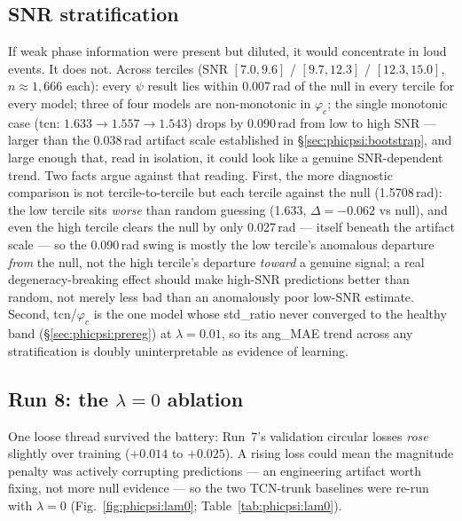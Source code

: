 \subsection{SNR stratification}
\label{sec:phicpsi:snr}

If weak phase information were present but diluted, it would concentrate in loud events.
It does not.
Across terciles (SNR $[7.0, 9.6]$ / $[9.7, 12.3]$ / $[12.3, 15.0]$, $n \approx 1{,}666$ each): every $\psi$ result lies within 0.007\,rad of the null in every tercile for every model; three of four models are non-monotonic in $\varphi_c$; the single monotonic case (tcn: $1.633 \to 1.557 \to 1.543$) drops by 0.090\,rad from low to high SNR --- larger than the 0.038\,rad artifact scale established in \S\ref{sec:phicpsi:bootstrap}, and large enough that, read in isolation, it could look like a genuine SNR-dependent trend.
Two facts argue against that reading.
First, the more diagnostic comparison is not tercile-to-tercile but each tercile against the null (1.5708\,rad): the low tercile sits \emph{worse} than random guessing (1.633, $\Delta = -0.062$ vs null), and even the high tercile clears the null by only 0.027\,rad --- itself beneath the artifact scale --- so the 0.090\,rad swing is mostly the low tercile's anomalous departure \emph{from} the null, not the high tercile's departure \emph{toward} a genuine signal; a real degeneracy-breaking effect should make high-SNR predictions better than random, not merely less bad than an anomalously poor low-SNR estimate.
Second, tcn/$\varphi_c$ is the one model whose std\_ratio never converged to the healthy band (\S\ref{sec:phicpsi:prereg}) at $\lambda = 0.01$, so its ang\_MAE trend across any stratification is doubly uninterpretable as evidence of learning.

\subsection{Run 8: the $\lambda = 0$ ablation}
\label{sec:phicpsi:ablation}

One loose thread survived the battery: Run~7's validation circular losses \emph{rose} slightly over training ($+0.014$ to $+0.025$).
A rising loss could mean the magnitude penalty was actively corrupting predictions --- an engineering artifact worth fixing, not more null evidence --- so the two TCN-trunk baselines were re-run with $\lambda = 0$ (Fig.~\ref{fig:phicpsi:lam0}; Table~\ref{tab:phicpsi:lam0}).

